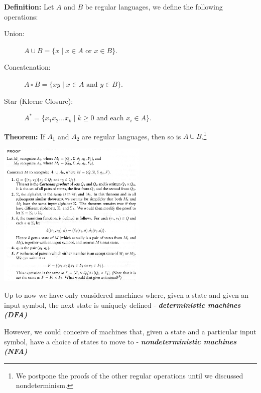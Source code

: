 \documentclass[a4paper,blends,pdf,colorBG,slideColor]{prosper}
\begin{document}

\vspace{.5in}

\es

{\bf Definition:} Let $A$ and $B$ be regular languages, we define the following
operations:
\begin{description}
\item[Union:] $A \cup B = \{ x \mid x \in A \mbox{ or } x\in B\}$.
\item[Concatenation:] $A \circ B = \{ xy \mid x\in A \mbox{ and } y \in B\}$.
\item[Star (Kleene Closure):] $A^* =  \{ x_1 x_2 \ldots x_k \mid k \ge 0 \mbox{ and each } x_i \in A\}$.
\end{description}

\es

{\bf Theorem:} If $A_1$ and $A_2$ are regular languages, then so is $A \cup B$.\footnote{We postpone the
proofs of the other regular operations until we discussed nondeterminism.}

\vspace{2in}
\es

\begin{center}
\includegraphics[height=70mm]{images/union-proof.eps}
\end{center}
\es

Up to now we have only considered machines where, given a state and given an input symbol, the next state is uniquely defined - {\bf\em deterministic machines (DFA)}

However, we could conceive of machines that, given a state and a particular input symbol, have a choice of states to move to - {\bf\em nondeterministic machines (NFA)}
\end{document}
